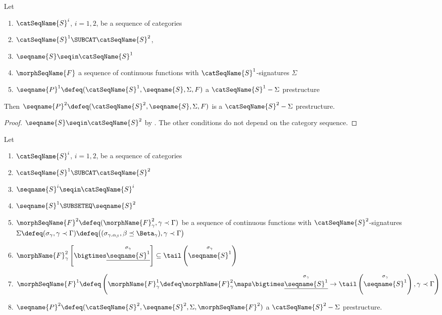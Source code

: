 \documentclass{article}
\begin{document}
\begin{lemma}[Prestructures]
\label{lem:pre}
Let

\begin{enumerate}
\item
$\catSeqName{S}^i$, $i=1,2$, be a sequence of
categories
\item
\nobreaks
  {{
    $\catSeqName{S}^1 \SUBCAT \catSeqName{S}^2$,
  }}
\item
$\seqname{S} \seqin \catSeqName{S}^1$
\item
$\morphSeqName{F}$ a sequence of continuous functions with
$\catSeqName{S}^1$-signatures $\Sigma$
\item
$\seqname{P}^1 \defeq (\catSeqName{S}^1, \seqname{S}, \Sigma, F)$ a
$\catSeqName{S}^1-\Sigma$ prestructure
\end{enumerate}

Then
$\seqname{P}^2 \defeq (\catSeqName{S}^2, \seqname{S}, \Sigma, F)$ is a
$\catSeqName{S}^2-\Sigma$ prestructure.

\begin{proof}
$\seqname{S} \seqin \catSeqName{S}^2$ by .
The other conditions do not depend on the category sequence.
\end{proof}

Let

\begin{enumerate}
\item
$\catSeqName{S}^i$, $i=1,2$, be a sequence of categories
\item
$\catSeqName{S}^1 \SUBCAT \catSeqName{S}^2$
\item
$\seqname{S}^i \seqin \catSeqName{S}^i$
\item
$\seqname{S}^1 \SUBSETEQ \seqname{S}^2$
\item
$
  \morphSeqName{F}^2 \defeq
  (\morphName{F}^2_\gamma, \gamma \prec \Gamma)
$
be a sequence of continuous functions with $\catSeqName{S}^2$-signatures
$
  \Sigma \defeq
  (\sigma_\gamma, \gamma \prec \Gamma) \defeq
  \bigl (
    (
      \sigma_{\gamma.{\alpha_\beta}},
      \beta \preceq \Beta_\gamma
    ),
    \gamma \prec \Gamma
  \bigr )
$
\item
$
  \morphName{F}^2_\gamma
    \left [
      \bigtimes \underline{\overset{\sigma_\gamma}{\seqname{S}^1}}
    \right ]
  \subseteq
  \tail \left ( \overset{\sigma_\gamma}{\seqname{S}^1} \right )
$
\item
$
  \morphSeqName{F}^1 \defeq
  \left (
    \morphName{F}^1_\gamma \defeq
        \morphName{F}^2_\gamma \maps
          \bigtimes \underline{\overset{\sigma_\gamma}{\seqname{S}^1}}
          \to
          \tail \left ( \overset{\sigma_\gamma}{\seqname{S}^1} \right ),
        \gamma  \prec \Gamma
  \right )
$
\item
$
  \seqname{P}^2 \defeq
  (\catSeqName{S}^2, \seqname{S}^2, \Sigma, \morphSeqName{F}^2)
$
a $\catSeqName{S}^2-\Sigma$ prestructure.
\end{enumerate}


\end{lemma}
\end{document}
